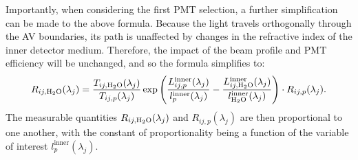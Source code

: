 Importantly, when considering the first PMT selection, a further simplification can be made to the above formula. Because the light travels orthogonally through the AV boundaries, its path is unaffected by changes in the refractive index of the inner detector medium. Therefore, the impact of the beam profile and PMT efficiency will be unchanged, and so the formula simplifies to:
\begin{equation}\label{eq:smellie_ext_length_rsrw_formula_1PMT}
    R_{ij,\ce{H_{2}O}}(\lambda_{j}) = 
    \frac{T_{ij,\ce{H_{2}O}}(\lambda_{j})}{T_{ij,p}(\lambda_{j})}
    \exp\left(
        \frac{L_{ij,p}^{\mathrm{inner}}(\lambda_{j})}{l_{p}^{\mathrm{inner}}(\lambda_{j})}
        -\frac{L_{ij,\ce{H_{2}O}}^{\mathrm{inner}}(\lambda_{j})}{l_{\ce{H_{2}O}}^{\mathrm{inner}}(\lambda_{j})}
    \right)
    \cdot  R_{ij,p}(\lambda_{j}).
\end{equation}
The measurable quantities $R_{ij,\ce{H_{2}O}}(\lambda_{j})$ and $R_{ij,p}(\lambda_{j})$ are then proportional to one another, with the constant of proportionality being a function of the variable of interest $l_{p}^{\mathrm{inner}}(\lambda_{j})$.


